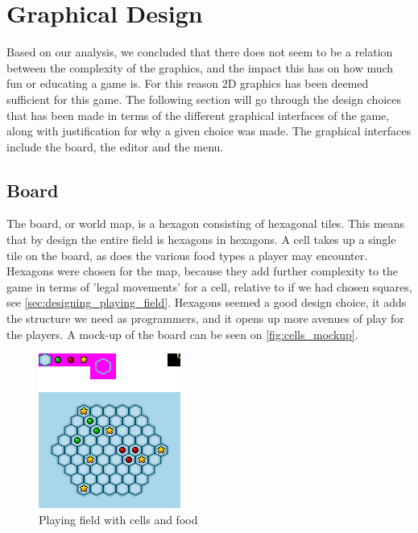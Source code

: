 \section{Graphical Design}
\label{sec:graphical_design}

Based on our analysis, we concluded that there does not seem to be a relation between the complexity of the graphics, and the impact this has on how much fun or educating a game is.
For this reason 2D graphics has been deemed sufficient for this game.
The following section will go through the design choices that has been made in terms of the different graphical interfaces of the game, along with justification for why a given choice was made. The graphical interfaces include the board, the editor and the menu.

\subsection{Board}
The board, or world map, is a hexagon consisting of hexagonal tiles.
This means that by design the entire field is hexagons in hexagons. 
A cell takes up a single tile on the board, as does the various food types a player may encounter.
Hexagons were chosen for the map, because they add further complexity to the game in terms of 'legal movements' for a cell, relative to if we had chosen squares, see \autoref{sec:designing_playing_field}.
Hexagons seemed a good design choice, it adds the structure we need as programmers, and it opens up more avenues of play for the players.
A mock-up of the board can be seen on \autoref{fig:cells_mockup}.\newline

\begin{figure}[ht]
	\centering
		\includegraphics{img/cells_mockup.png}
	\caption{Playing field with cells and food}
	\label{fig:cells_mockup}
\end{figure}

